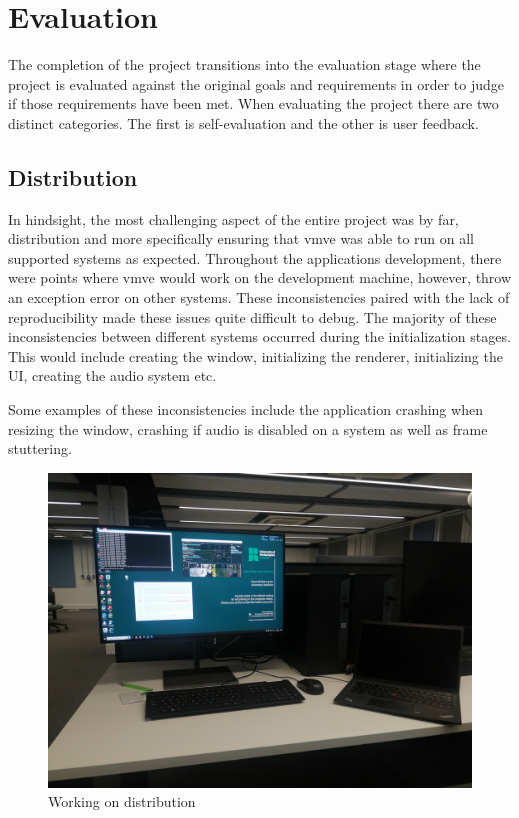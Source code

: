 \documentclass[11pt]{article}
\begin{document}
\clearpage
\section{Evaluation}
The completion of the project transitions into the evaluation stage where the
project is evaluated against the original goals and requirements in order to
judge if those requirements have been met. When evaluating the project there are
two distinct categories. The first is self-evaluation and the other is user
feedback.


\subsection{Distribution}
In hindsight, the most challenging aspect of the entire project was by far,
distribution and more specifically ensuring that \gls{vmve} was able to run on all
supported systems as expected. Throughout the applications development, there
were points where \gls{vmve} would work on the development machine, however,
throw an exception error on other systems. These inconsistencies paired with the
lack of reproducibility made these issues quite difficult to debug. The majority
of these inconsistencies between different systems occurred during the
initialization stages. This would include creating the window, initializing the
renderer, initializing the UI, creating the audio system etc.

Some examples of these inconsistencies include the application crashing when
resizing the window, crashing if audio is disabled on a system as well as frame
stuttering.

\begin{figure}[h!]
  \centering
  \includegraphics[width=\textwidth]{images/multiple_systems.png}
  \caption{Working on distribution}
  \label{fig:multiple_systems}
\end{figure}
\end{document}
